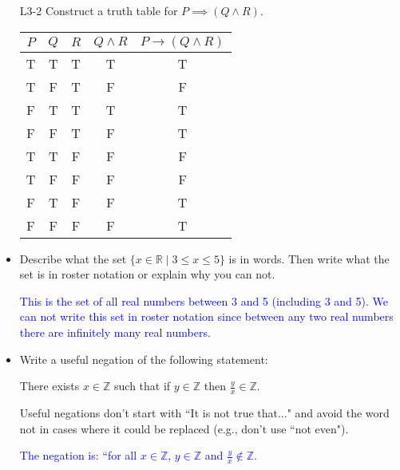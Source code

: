 \documentclass[10pt]{article}
\newcommand{\bs}{\begin{solution}}
\begin{document}
\begin{itemize}
\newpage

\item[L3-2] Construct a truth table for $P \implies (Q\wedge R)$.

\bs
\begin{center}
\begin{tabular}{c|c|c|c|c}
$P$ &$Q$ &$R$ &$Q\wedge R$ &$P\rightarrow (Q\wedge R)$\\
\hline
T &T &T  &T &T \\
T &F &T  &F &F \\
F &T &T  &T &T \\
F &F &T  &F &T \\
T &T &F &F&F \\
T &F &F &F&F \\
F &T &F &F &T \\
F &F &F &F &T\\
\end{tabular}
\end{center}
\end{solution}
\vfill
\vfill
\vfill


\item[L4-2]  Describe what the set $\{x\in\mathbb{R} \mid 3\leq x\leq 5\}$ is in words. Then write what the set is in roster notation or explain why you can not.

\bs \textcolor{blue}{This is the set of all real numbers between 3 and 5 (including 3 and 5). We can not write this set in roster notation since between any two real numbers there are infinitely many real numbers.}
\end{solution}

\vfill

\item[L5-1] Write a useful negation of the following statement:
		\begin{center}
		There exists $x\in\mathbb{Z}$ such that if $y\in \mathbb{Z}$ then $\frac{y}{x}\in\mathbb{Z}$.
		\end{center}
		Useful negations don't start with ``It is not true that..." and avoid the word not in cases where it could be replaced (e.g., don't use ``not even").

\bs \textcolor{blue}{The negation is: ``for all $x\in\mathbb{Z}$, $y\in\mathbb{Z}$ and $\frac{y}{x}\notin\mathbb{Z}$.}
\end{solution}

\vfill

\end{itemize}
	
\end{document}
